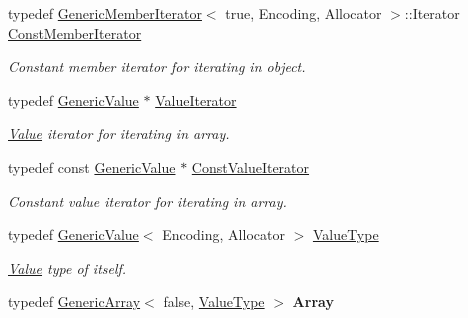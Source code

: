 \begin{DoxyCompactItemize}
\mbox{\label{classGenericValue_aac08c3e660a9036d3dcb8b10ff6c61f4}} 
typedef \hyperlink{classGenericMemberIterator}{Generic\+Member\+Iterator}$<$ true, Encoding, Allocator $>$\+::Iterator \hyperlink{classGenericValue_aac08c3e660a9036d3dcb8b10ff6c61f4}{Const\+Member\+Iterator}
\begin{DoxyCompactList}\small\item\em Constant member iterator for iterating in object. \end{DoxyCompactList}\item 
\mbox{\label{classGenericValue_aee30721a49688ba0f865f5d581eb6be9}} 
typedef \hyperlink{classGenericValue}{Generic\+Value} $\ast$ \hyperlink{classGenericValue_aee30721a49688ba0f865f5d581eb6be9}{Value\+Iterator}
\begin{DoxyCompactList}\small\item\em \hyperlink{classValue}{Value} iterator for iterating in array. \end{DoxyCompactList}\item 
\mbox{\label{classGenericValue_a49010c6d6886f96ff0b0c51bccc7f6ea}} 
typedef const \hyperlink{classGenericValue}{Generic\+Value} $\ast$ \hyperlink{classGenericValue_a49010c6d6886f96ff0b0c51bccc7f6ea}{Const\+Value\+Iterator}
\begin{DoxyCompactList}\small\item\em Constant value iterator for iterating in array. \end{DoxyCompactList}\item 
\mbox{\label{classGenericValue_a43a39bb4fca9b9d3de3da6ac353d25ce}} 
typedef \hyperlink{classGenericValue}{Generic\+Value}$<$ Encoding, Allocator $>$ \hyperlink{classGenericValue_a43a39bb4fca9b9d3de3da6ac353d25ce}{Value\+Type}
\begin{DoxyCompactList}\small\item\em \hyperlink{classValue}{Value} type of itself. \end{DoxyCompactList}\item 
\mbox{\label{classGenericValue_a149e12992b8f6064c865a4cf55981b89}} 
typedef \hyperlink{classGenericArray}{Generic\+Array}$<$ false, \hyperlink{classGenericValue_a43a39bb4fca9b9d3de3da6ac353d25ce}{Value\+Type} $>$ {\bfseries Array}

\end{DoxyCompactItemize}
